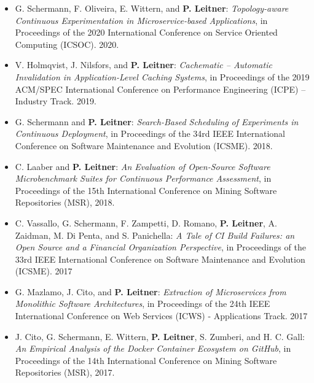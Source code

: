 \documentclass[paper=letter,fontsize=11pt]{scrartcl} %
\begin{document}
\begin{itemize}
\item G. Schermann, F. Oliveira, E. Wittern, and \textbf{P. Leitner}: \emph{Topology-aware Continuous Experimentation in Microservice-based Applications}, in Proceedings of the 2020 International Conference on Service Oriented Computing (ICSOC). 2020.
	\item V. Holmqvist, J. Nilsfors, and \textbf{P. Leitner}: \emph{Cachematic -- Automatic Invalidation in Application-Level Caching Systems}, in Proceedings of the 2019 ACM/SPEC  International Conference on Performance Engineering (ICPE) -- Industry Track. 2019.
	\item G. Schermann and \textbf{P. Leitner}: \emph{Search-Based Scheduling of Experiments in Continuous Deployment}, in Proceedings of the 34rd IEEE International Conference on Software Maintenance and Evolution (ICSME). 2018.
	\item C. Laaber and \textbf{P. Leitner}: \emph{An Evaluation of Open-Source Software Microbenchmark Suites for Continuous Performance Assessment}, in Proceedings of the 15th International Conference on Mining Software Repositories (MSR), 2018.
	\item C. Vassallo, G. Schermann, F. Zampetti, D. Romano, \textbf{P. Leitner}, A. Zaidman, M. Di Penta, and S. Panichella: \emph{A Tale of CI Build Failures: an Open Source and a Financial Organization Perspective}, in Proceedings of the 33rd IEEE International Conference on Software Maintenance and Evolution (ICSME). 2017
	\item G. Mazlamo, J. Cito, and \textbf{P. Leitner}: \emph{Extraction of Microservices from Monolithic Software Architectures}, in Proceedings of the 24th IEEE International Conference on Web Services (ICWS) - Applications Track. 2017
	\item J. Cito, G. Schermann, E. Wittern, \textbf{P. Leitner}, S. Zumberi, and H. C. Gall: \emph{An Empirical Analysis of the Docker Container Ecosystem on GitHub}, in Proceedings of the 14th International Conference on Mining Software Repositories (MSR), 2017.

\end{itemize}
\end{document}
